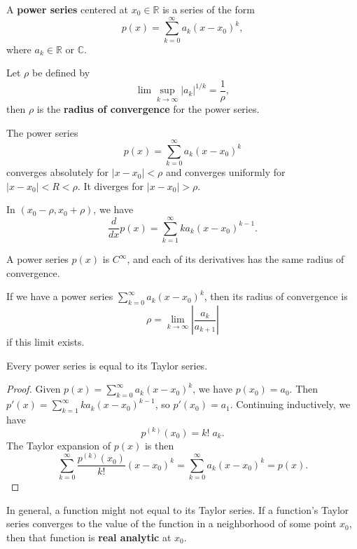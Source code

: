 \documentclass[twoside,10pt]{report}
\begin{document}
\begin{defn}[]
A \textbf{power series} centered at $x_0 \in \mathbb{R}$ is a series of the form
\[
	p(x) = \sum_{k=0}^{\infty} a_k (x-x_0)^k,
\] where $a_k \in \mathbb{R} \text{ or } \mathbb{C}$.
\end{defn}

\begin{defn}[]
Let $\rho$ be defined by
\[
\lim \sup_{k \to \infty} |a_k|^{1/k} = \frac{1}{\rho},
\] then $\rho$ is the \textbf{radius of convergence} for the power series.
\end{defn}

\begin{thrm}[]
The power series
\[
	p(x) = \sum_{k=0}^{\infty} a_k (x-x_0)^k
\] converges absolutely for $|x-x_0|<\rho$ and converges uniformly for $|x-x_0| < R < \rho$. It diverges for $|x-x_0|>\rho$.
\end{thrm}

\begin{cor}
	In $(x_0-\rho, x_0+\rho)$, we have
	\[
		\frac{d }{d x} p(x) = \sum_{k=1}^{\infty} k a_k (x-x_0)^{k-1}.
	\] 
\end{cor}

\begin{cor}
	A power series $p(x)$ is $C^{\infty}$, and each of its derivatives has the same radius of convergence.
\end{cor}

\begin{thrm}[]
	If we have a power series $\sum_{k=0}^{\infty} a_k(x-x_0)^{k}$, then its radius of convergence is
	\[
	\rho = \lim_{k \to \infty} \left| \frac{a_k}{a_{k+1}}  \right|
	\] if this limit exists.
\end{thrm}

\begin{prop}
	Every power series is equal to its Taylor series.
\end{prop}
\begin{proof}
	Given $p(x) = \sum_{k=0}^{\infty} a_k (x-x_0)^k$, we have $p(x_0) = a_0$. Then $p'(x) = \sum_{k=1}^{\infty} k a_k (x-x_0)^{k-1}$, so $p'(x_0) = a_1$. Continuing inductively, we have
	\[
		p^{(k)}(x_0) = k! \; a_k.
	\] The Taylor expansion of $p(x)$ is then
	\[
		\sum_{k=0}^{\infty} \frac{p^{(k)}(x_0)}{k!} (x-x_0)^k = \sum_{k=0}^{\infty} a_k (x-x_0)^k = p(x).
	\]
\end{proof}

\begin{note}{}{}
	In general, a function might not equal to its Taylor series. If a function's Taylor series converges to the value of the function in a neighborhood of some point $x_0$, then that function is \textbf{real analytic} at $x_0$.
\end{note}
\end{document}
